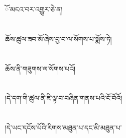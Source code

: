 ོ་མངའ་བར་འགྱུར་ཅེ་ན།\chapter{ }ཆོས་ཚུལ་ཟབ་མོ་ཞེས་བྱ་བ་ལ་སོགས་པ་སྨོས་ཏེ།\chapter{ }ཆོས་ནི་གཟུགས་ལ་སོགས་པའོ།\chapter{ }།དེ་དག་གི་ཚུལ་ནི་ཇི་ལྟ་བ་བཞིན་གནས་པའི་ངོ་བོའོ།\chapter{ }།དེ་ཡང་དངོས་པོའི་རིགས་མཐུན་པ་དང་མི་མཐུན་པ་